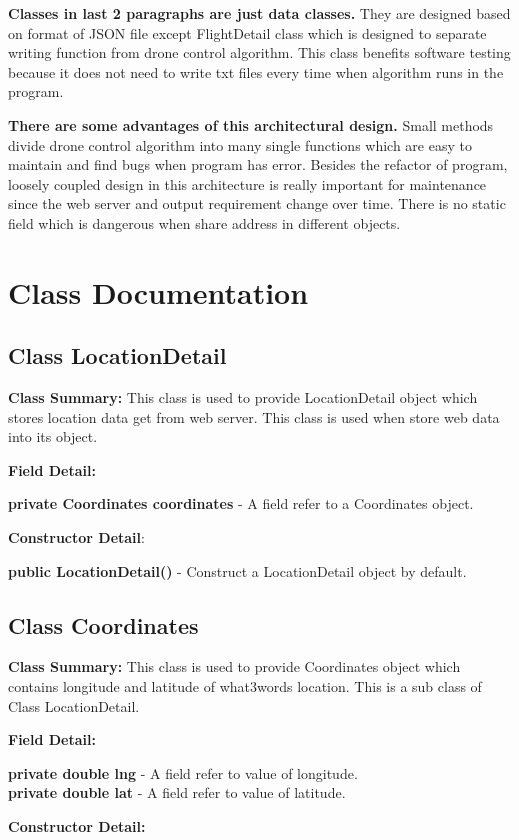\documentclass[12pt]{article}
\begin{document}
\textbf{Classes in last 2 paragraphs are just data classes.} They are designed based on format of JSON file except FlightDetail class which is designed to separate writing function from drone control algorithm. This class benefits software testing because it does not need to write txt files every time when algorithm runs in the program.

\textbf{There are some advantages of this architectural design.} Small methods divide drone control algorithm into many single functions which are easy to maintain and find bugs when program has error. Besides the refactor of program, loosely coupled design in this architecture is really important for maintenance since the web server and output requirement change over time. There is no static field which is dangerous when share address in different objects. 

\newpage
\section {Class Documentation}
\subsection {Class LocationDetail}
\textbf{Class Summary:} This class is used to provide LocationDetail object which stores location data get from web server. This class is used when store web data into its object.

\textbf{Field Detail:}

\textbf{private Coordinates coordinates} - A field refer to a Coordinates object.

\textbf{Constructor Detail}:

\textbf{public LocationDetail()} - Construct a LocationDetail object by default.

\subsection {Class Coordinates}
\textbf{Class Summary:} This class is used to provide Coordinates object which contains longitude and latitude of what3words location. This is a sub class of Class LocationDetail.

\textbf{Field Detail:}

\textbf{private double lng} - A field refer to value of longitude.\\
\textbf{private double lat} - A field refer to value of latitude.

\textbf{Constructor Detail:}
\end{document}
